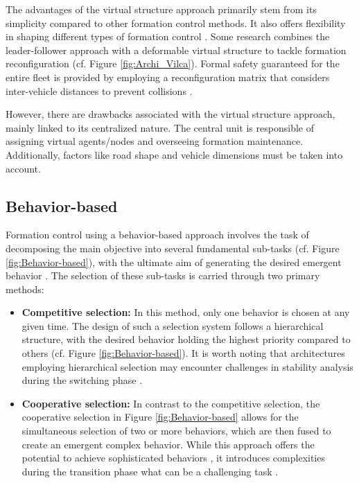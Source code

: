 The advantages of the virtual structure approach primarily stem from its simplicity compared to other formation control methods. It also offers flexibility in shaping different types of formation control \cite{4651041}\cite{benzerrouk:tel-00669559}\cite{2014_Benzerrouk_RAS}. Some research combines the leader-follower approach with a deformable  virtual structure to tackle formation reconfiguration \cite{8430659} (cf. Figure \ref{fig:Archi_Vilca}). Formal safety guaranteed for the entire fleet is provided by employing a reconfiguration matrix that considers inter-vehicle distances to prevent collisions \cite{8430659} \cite{ventura2015safe}. 

However, there are drawbacks associated with the virtual structure approach, mainly linked to its centralized nature. The central unit is responsible of assigning virtual agents/nodes and overseeing formation maintenance. Additionally, factors like road shape and vehicle dimensions must be taken into account.




\subsection{Behavior-based}
Formation control using a behavior-based approach involves the task of decomposing the main objective into several fundamental sub-tasks (cf. Figure \ref{fig:Behavior-based}), with the ultimate aim of generating the desired emergent behavior \cite{arkin1998behavior}. The selection of these sub-tasks is carried through two primary methods: 

\begin{itemize}
    \item \textbf{Competitive selection:} In this method, only one behavior is chosen at any given time. The design of such a selection system follows a hierarchical structure, with the desired behavior holding the highest priority compared to others (cf. Figure \ref{fig:Behavior-based}). It is worth noting that architectures employing hierarchical selection may encounter challenges in stability analysis during the switching phase \cite{adouane2016autonomous}. 

    \item \textbf{Cooperative selection:} In contrast to the competitive selection, the cooperative selection in Figure \ref{fig:Behavior-based} allows for the simultaneous selection of two or more behaviors, which are then fused to create an emergent complex behavior. While this approach offers the potential to achieve sophisticated behaviors \cite{adouane2016autonomous}, it introduces complexities during the transition phase what can be a challenging task \cite{SCHONER1995213}. 
    
\end{itemize}

